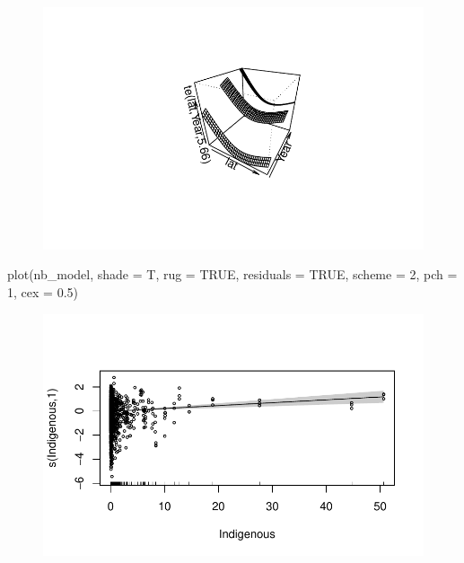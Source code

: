 \documentclass[
  letterpaper,
  DIV=11,
  numbers=noendperiod]{scrartcl}
\newenvironment{Shaded}{\begin{snugshade}}{\end{snugshade}}
\newcommand{\AttributeTok}[1]{\textcolor[rgb]{0.40,0.45,0.13}{#1}}
\newcommand{\ConstantTok}[1]{\textcolor[rgb]{0.56,0.35,0.01}{#1}}
\newcommand{\DecValTok}[1]{\textcolor[rgb]{0.68,0.00,0.00}{#1}}
\newcommand{\FloatTok}[1]{\textcolor[rgb]{0.68,0.00,0.00}{#1}}
\newcommand{\FunctionTok}[1]{\textcolor[rgb]{0.28,0.35,0.67}{#1}}
\newcommand{\NormalTok}[1]{\textcolor[rgb]{0.00,0.23,0.31}{#1}}
\begin{document}
\begin{figure}[H]

{\centering \includegraphics{Group34Coursework_files/figure-pdf/unnamed-chunk-17-11.pdf}

}

\end{figure}

\begin{Shaded}
\begin{Highlighting}[]
\FunctionTok{plot}\NormalTok{(nb\_model, }\AttributeTok{shade =}\NormalTok{ T, }\AttributeTok{rug =} \ConstantTok{TRUE}\NormalTok{, }\AttributeTok{residuals =} \ConstantTok{TRUE}\NormalTok{, }\AttributeTok{scheme =} \DecValTok{2}\NormalTok{, }\AttributeTok{pch =} \DecValTok{1}\NormalTok{,}
    \AttributeTok{cex =} \FloatTok{0.5}\NormalTok{)}
\end{Highlighting}
\end{Shaded}

\begin{figure}[H]

{\centering \includegraphics{Group34Coursework_files/figure-pdf/unnamed-chunk-18-1.pdf}

}

\end{figure}
\end{document}
